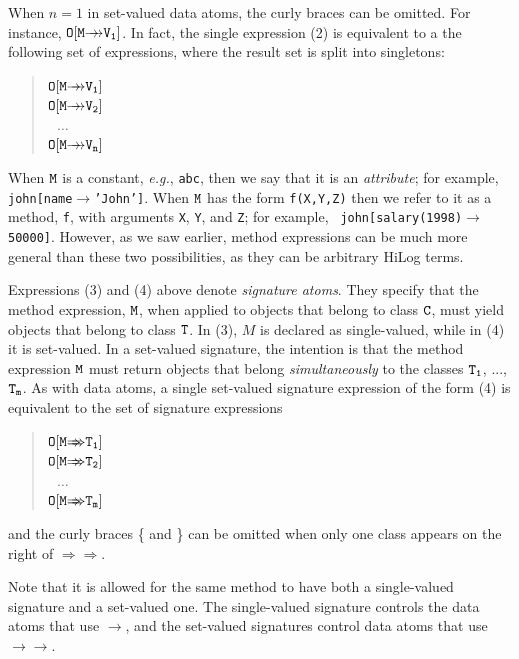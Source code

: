 \documentclass[11pt]{article}
\newcommand{\fd}{\ensuremath{{\rightarrow}}}                   %
\newcommand{\mvd}{\ensuremath{{\rightarrow\!\!\!\!\rightarrow}}}  %
\newcommand{\Mvd}{\ensuremath{{\Rightarrow\!\!\!\!\Rightarrow}}}  %
\newcommand{\fl}{\mbox{F-logic}\xspace}
\begin{document}
\begin{itemize}
  When $n=1$ in set-valued data atoms, the curly braces can be omitted. For
  instance, $\tt O[M\mvd V_1]$. In fact, the single expression (2) is
  equivalent to a the following set of expressions, where the result set is
  split into singletons:
  \begin{quote}
  $\tt O[M\mvd V_1]$    \\
  $\tt O[M\mvd V_2]$    \\
  $~~~\dots$\\
  $\tt O[M\mvd V_n]$
  \end{quote}
  
  When $\tt M$ is a constant, {\it e.g.}, {\tt abc}, then we say that it is
  an \emph{attribute}; for example, {\tt john[name\fd 'John']}. When $\tt
  M$ has the form {\tt f(X,Y,Z)} then we refer to it as a method, {\tt f},
  with arguments {\tt X}, {\tt Y}, and {\tt Z}; for example, {\tt
  john[salary(1998)\fd 50000]}.  However, as we saw
  earlier, method expressions can be much more general than these two
  possibilities, as they can be arbitrary HiLog terms.


  \medskip

  \index{signature!in \fl}
  Expressions (3) and (4) above denote \emph{signature atoms}. They specify
  that the method expression, $\tt M$, when applied to objects that belong
  to class $\tt C$, must yield objects that belong to class $\tt T$.  In (3),
  $M$ is declared as single-valued, while in (4) it is set-valued. In a
  set-valued signature, the intention is that the method expression $\tt M$
  must return objects that belong \emph{simultaneously} to the classes
  $\tt T_1$, ..., $\tt T_m$. As with data atoms, a single set-valued
  signature expression of the form (4) is equivalent to the set of
  signature expressions
  \begin{quote}
      $\tt O[M\Mvd T_1]$    \\
      $\tt O[M\Mvd T_2]$    \\
      $~~~\dots$\\
      $\tt O[M\Mvd T_m]$
  \end{quote}
  and the curly braces \{ and \} can be omitted when only one class appears
  on the right of $\Mvd$.

  Note that it is allowed for the same method to have both a single-valued
  signature and a set-valued one. The single-valued signature controls the
  data atoms that use $\fd$, and the set-valued signatures control data
  atoms that use $\mvd$.
  

\end{itemize}
\end{document}
